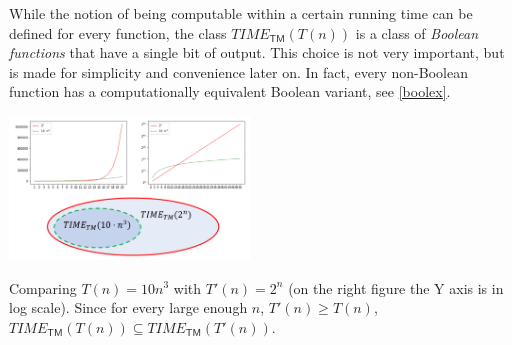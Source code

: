 While the notion of being computable within a certain running time can
be defined for every function, the class
\(\ensuremath{\mathit{TIME}}_{\mathsf{TM}}(T(n))\) is a class of
\emph{Boolean functions} that have a single bit of output. This choice
is not very important, but is made for simplicity and convenience later
on. In fact, every non-Boolean function has a computationally equivalent
Boolean variant, see \cref{boolex}.

\hypertarget{timeboundexample}{}


\begin{marginfigure}
\centering
\includegraphics[width=\linewidth, height=1.5in, keepaspectratio]{../figure/exampletimebounds.png}
\caption{Comparing \(T(n)=10n^3\) with \(T'(n) = 2^n\) (on the right
figure the Y axis is in log scale). Since for every large enough \(n\),
\(T'(n) \geq T(n)\),
\(\ensuremath{\mathit{TIME}}_{\mathsf{TM}}(T(n)) \subseteq \ensuremath{\mathit{TIME}}_{\mathsf{TM}}(T'(n))\).}
\label{examplefimeboundsfig}
\end{marginfigure}


